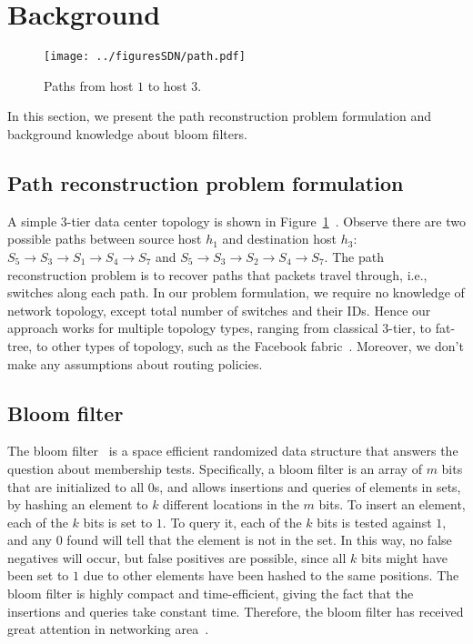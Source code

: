 \section{Background}
\label{sec:background}

\begin{figure}[t]
\centering
\begin{minipage}[h]{\linewidth}
	\centering
	 \texttt{[image: ../figuresSDN/path.pdf]}
	\caption{Paths from host $1$ to host $3$.}
	\label{fig:path}
\end{minipage}
\end{figure}

In this section, we present the path reconstruction problem formulation and background knowledge about bloom filters.

\subsection{Path reconstruction problem formulation}

A simple 3-tier data center topology is shown in Figure~\ref{fig:path}~\cite{Benson2010}. Observe there are two possible paths between source host $h_1$ and destination host $h_3$: $S_5\rightarrow S_3\rightarrow S_1 \rightarrow S_4 \rightarrow S_7$ and $S_5\rightarrow S_3\rightarrow S_2 \rightarrow S_4 \rightarrow S_7$. The path reconstruction problem is to recover paths that packets travel through, i.e., switches along each path. In our problem formulation, we require no knowledge of network topology, except total number of switches and their IDs. Hence our approach works for multiple topology types, ranging from classical 3-tier, to fat-tree, to other types of topology, such as the Facebook fabric~\cite{FacebookFabric}. Moreover, we don't make any assumptions about routing policies. 


\subsection{Bloom filter}

The bloom filter~\cite{Bloom1970} is a space efficient randomized data structure that answers the question about membership tests. Specifically, a bloom filter is an array of $m$ bits that are initialized to all $0$s, and allows insertions and queries of elements in sets, by hashing an element to $k$ different locations in the $m$ bits. To insert an element, each of the $k$ bits is set to $1$. To query it, each of the $k$ bits is tested against $1$, and any $0$ found will tell that the element is not in the set. In this way, no false negatives will occur, but false positives are possible, since all $k$ bits might have been set to $1$ due to other elements have been hashed to the same positions. The bloom filter is highly compact and time-efficient, giving the fact that the insertions and queries take constant time. Therefore, the bloom filter has received great attention in networking area~\cite{Whitaker2002, Broder2003, Tarkoma2012, Chen2013}.